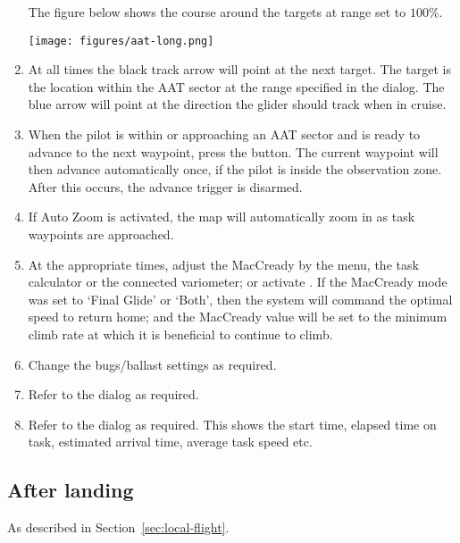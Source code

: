 \begin{enumerate}
The figure below shows the course around the targets at range set to $100$\%.
\begin{center}
\texttt{[image: figures/aat-long.png]}
\end{center}

\item  At all times the black track arrow will point at the next target.  The
target is the location within the AAT sector at the range specified in
the  dialog.  The blue arrow will point at the direction
the glider should track when in cruise.

\item  When the pilot is within or approaching an AAT sector and is ready to
advance to the next waypoint, press the  button.  The
current waypoint will then advance automatically once, if the pilot is
inside the observation zone.  After this occurs, the advance trigger
is disarmed.

\item If Auto Zoom is activated, the map will automatically zoom in as task waypoints are approached.

\item  At the appropriate times, adjust the MacCready by the menu,
the task calculator or the connected variometer; or activate .
If the MacCready mode was set to `Final Glide' or `Both', then the system will command the optimal 
speed to return home; and the MacCready value will be set to the minimum climb
rate at which it is beneficial to continue to climb.
  
\item  Change the bugs/ballast settings as required.
\item  Refer to the  dialog as required. 
\item  Refer to the  dialog as required.  This shows the start
time, elapsed time on task, estimated arrival time, average task speed etc.
\end{enumerate}

\subsection*{After landing}
As described in Section~\ref{sec:local-flight}.

